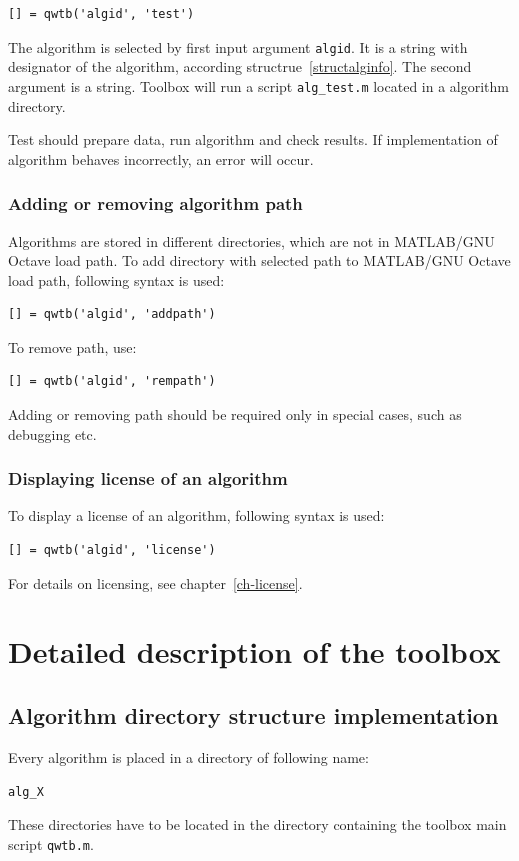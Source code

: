 \documentclass[12pt,a4paper,oneside]{report} %
\def\matlab{{\sc MATLAB}\xspace}
\def\octave{{\sc GNU Octave}\xspace}
\def\mgo{\matlab/\octave\xspace}
\begin{document}
\begin{lstlisting}
[] = qwtb('algid', 'test')
\end{lstlisting}

The algorithm is selected by first input argument \lstinline{algid}. It is a string with
designator of the algorithm, according structrue~\ref{structalginfo}. The second argument is a
string. Toolbox will run a script \lstinline{alg_test.m} located in a algorithm directory.

Test should prepare data, run algorithm and check results. If implementation of algorithm
behaves incorrectly, an error will occur.

\subsection{Adding or removing algorithm path} %
Algorithms are stored in different directories, which are not in \mgo load path. To add directory
with selected path to \mgo load path, following syntax is used:

\begin{lstlisting}
[] = qwtb('algid', 'addpath')
\end{lstlisting}

To remove path, use:

\begin{lstlisting}
[] = qwtb('algid', 'rempath')
\end{lstlisting}

Adding or removing path should be required only in special cases, such as debugging etc.

\subsection{Displaying license of an algorithm} %
To display a license of an algorithm, following syntax is used:
\begin{lstlisting}
[] = qwtb('algid', 'license')
\end{lstlisting}
For details on licensing, see chapter~\ref{ch-license}.


\chapter{Detailed description of the toolbox} %
\section{Algorithm directory structure implementation} %
Every algorithm is placed in a directory of following name:
\begin{center}
        {\tt alg\_X}
\end{center}
These directories have to be located in the directory containing the toolbox main script {\tt qwtb.m}.
\end{document}
